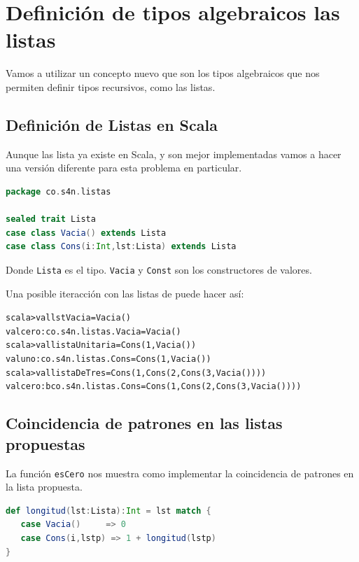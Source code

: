 \documentclass[12pt]{article}
\newcounter{problema}
\begin{document}
\section{Definición de tipos algebraicos las listas}
\label{sec:definicio-de-tipos}

Vamos a utilizar un concepto nuevo que son los tipos algebraicos que nos permiten definir tipos recursivos, como las listas.

\subsection{Definición de Listas en Scala}
\label{sec:def-naturales}

Aunque las lista ya existe en Scala, y son mejor implementadas vamos a
hacer una versión diferente para esta problema en particular.

\begin{lstlisting}[language=Scala]
package co.s4n.listas

sealed trait Lista
case class Vacia() extends Lista
case class Cons(i:Int,lst:Lista) extends Lista
\end{lstlisting}

Donde \texttt{Lista} es el tipo. \texttt{Vacia} y \texttt{Const} son los constructores de valores.

Una posible iteracción con las listas de puede hacer así:

\begin{alltt}
scala> val lstVacia = Vacia()
val cero: co.s4n.listas.Vacia = Vacia()
scala> val listaUnitaria = Cons(1, Vacia())
val uno: co.s4n.listas.Cons = Cons(1, Vacia())
scala> val listaDeTres = Cons(1,Cons(2,Cons(3,Vacia())))
val cero: bco.s4n.listas.Cons = Cons(1,Cons(2,Cons(3,Vacia())))
\end{alltt}

\subsection{Coincidencia de patrones en las listas propuestas}
\label{sec:pat-nat}

La función \texttt{esCero} nos muestra como implementar la coincidencia de patrones en la lista propuesta.

\begin{lstlisting}[language=Scala]
def longitud(lst:Lista):Int = lst match {
   case Vacia()     => 0
   case Cons(i,lstp) => 1 + longitud(lstp)
}
\end{lstlisting}
\end{document}
